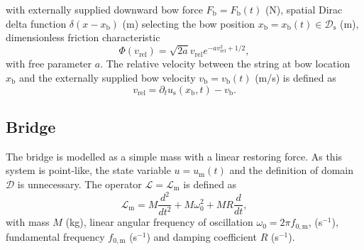 \documentclass[dvipsnames, pdftex]{article}
\begin{document}
with externally supplied downward bow force $F_\text{b} = F_\text{b}(t)$ (N), spatial Dirac delta function $\delta(x-x_\text{b})$ (m) selecting the bow position $x_\text{b} = x_\text{b}(t)\in \mathcal{D}_\text{s}$ (m), dimensionless friction characteristic
\begin{equation}
    \Phi(v_\text{rel}) = \sqrt{2a}v_\text{rel}e^{-av_\text{rel}^2+1/2},
\end{equation}
with free parameter $a$. The relative velocity between the string at bow location $x_\text{b}$ and the externally supplied bow velocity $v_\text{b} = v_\text{b}(t)$ (m/s) is defined as
\begin{equation}
    v_\text{rel} = \partial_tu_\text{s}(x_\text{b},t) - v_\text{b}.
\end{equation}

\subsection{Bridge}
The bridge is modelled as a simple mass with a linear restoring force. As this system is point-like, %
the state variable $u = u_\text{m}(t)$ and the definition of domain $\mathcal{D}$ is unnecessary. The operator $\mathcal{L}=\mathcal{L}_\text{m}$ is defined as
\begin{equation}
    \mathcal{L}_\text{m}=M\frac{d^2}{dt^2}+M\omega_0^2+MR\frac{d}{dt},
\end{equation}
with mass $M$ (kg), linear angular frequency of oscillation $\omega_0=2\pi f_{0,\text{m}}$,  (s$^{-1}$), fundamental frequency $f_{0,\text{m}}$ (s$^{-1}$) and damping coefficient $R$ (s$^{-1}$).
    
    
    
\end{document}
